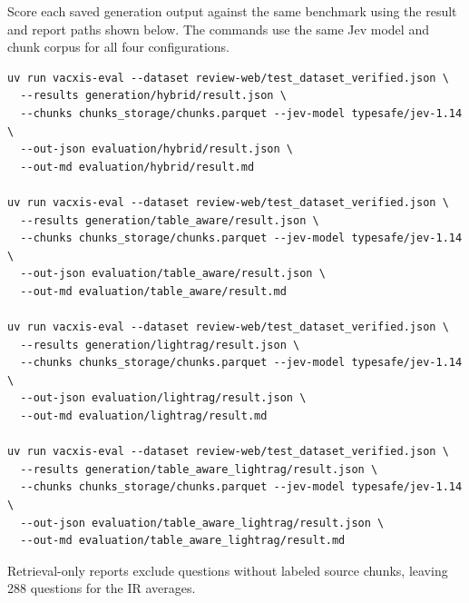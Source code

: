 \documentclass[sn-mathphys, oneside]{sn-jnl}
\begin{document}
Score each saved generation output against the same benchmark using the result and report paths shown below. The commands use the same Jev model and chunk corpus for all four configurations.
\begin{lstlisting}[basicstyle=\ttfamily\scriptsize,breaklines=true,columns=fullflexible]
uv run vacxis-eval --dataset review-web/test_dataset_verified.json \
  --results generation/hybrid/result.json \
  --chunks chunks_storage/chunks.parquet --jev-model typesafe/jev-1.14 \
  --out-json evaluation/hybrid/result.json \
  --out-md evaluation/hybrid/result.md

uv run vacxis-eval --dataset review-web/test_dataset_verified.json \
  --results generation/table_aware/result.json \
  --chunks chunks_storage/chunks.parquet --jev-model typesafe/jev-1.14 \
  --out-json evaluation/table_aware/result.json \
  --out-md evaluation/table_aware/result.md

uv run vacxis-eval --dataset review-web/test_dataset_verified.json \
  --results generation/lightrag/result.json \
  --chunks chunks_storage/chunks.parquet --jev-model typesafe/jev-1.14 \
  --out-json evaluation/lightrag/result.json \
  --out-md evaluation/lightrag/result.md

uv run vacxis-eval --dataset review-web/test_dataset_verified.json \
  --results generation/table_aware_lightrag/result.json \
  --chunks chunks_storage/chunks.parquet --jev-model typesafe/jev-1.14 \
  --out-json evaluation/table_aware_lightrag/result.json \
  --out-md evaluation/table_aware_lightrag/result.md
\end{lstlisting}

Retrieval-only reports exclude questions without labeled source chunks, leaving 288 questions for the IR averages.
\end{document}
